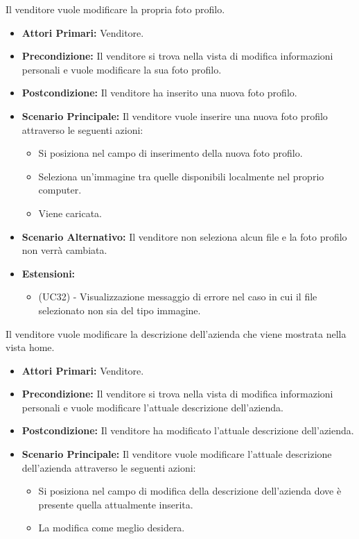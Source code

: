 Il venditore vuole modificare la propria foto profilo.
\begin{itemize}
    \item \textbf{Attori Primari:} Venditore.
    \item \textbf{Precondizione:} Il venditore si trova nella vista di modifica informazioni personali e vuole modificare la sua foto profilo.
    \item \textbf{Postcondizione:} Il venditore ha inserito una nuova foto profilo.
    \item \textbf{Scenario Principale:} Il venditore vuole inserire una nuova foto profilo attraverso le seguenti azioni:
    \begin{itemize}
        \item Si posiziona nel campo di inserimento della nuova foto profilo.
        \item Seleziona un'immagine tra quelle disponibili localmente nel proprio computer.
        \item Viene caricata.
    \end{itemize}
    \item \textbf{Scenario Alternativo:} Il venditore non seleziona alcun file e la foto profilo non verrà cambiata.
    \item \textbf{Estensioni:}
    \begin{itemize}
        \item (UC32) - Visualizzazione messaggio di errore nel caso in cui il file selezionato non sia del tipo immagine.
    \end{itemize}
\end{itemize}

Il venditore vuole modificare la descrizione dell'azienda che viene mostrata nella vista home.
\begin{itemize}
    \item \textbf{Attori Primari:} Venditore.
    \item \textbf{Precondizione:} Il venditore si trova nella vista di modifica informazioni personali e vuole modificare l'attuale descrizione dell'azienda.
    \item \textbf{Postcondizione:} Il venditore ha modificato l'attuale descrizione dell'azienda.
    \item \textbf{Scenario Principale:} Il venditore vuole modificare l'attuale descrizione dell'azienda attraverso le seguenti azioni:
    \begin{itemize}
        \item Si posiziona nel campo di modifica della descrizione dell'azienda dove è presente quella attualmente inserita.
        \item La modifica come meglio desidera.
    \end{itemize}
\end{itemize}


